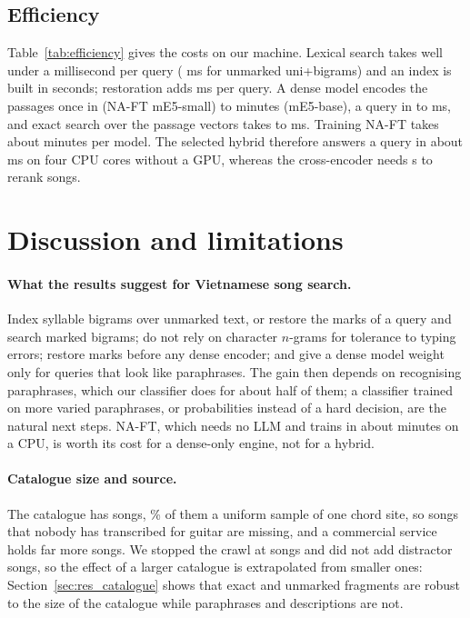 \documentclass[11pt]{article}
\begin{document}
\subsection{Efficiency}\label{sec:res_efficiency}

Table~\ref{tab:efficiency} gives the costs on our machine. Lexical search takes well under a millisecond per
query (\EffLexMsNodiac{} ms for unmarked uni+bigrams) and an index is built in seconds; restoration adds
\RestoreMsAll{} ms per query. A dense model encodes the \NPassages{} passages once in \EffEncodeMinNaftesmalls{}
(NA-FT mE5-small) to \EffEncodeMinEbase{} minutes (mE5-base), a query in \EffQueryMsNaftesmalls{} to
\EffQueryMsEbase{} ms, and exact search over the passage vectors takes \EffSearchMsNaftesmalls{} to
\EffSearchMsEbase{} ms. Training NA-FT takes about \NaftTrainMinutes{} minutes per model. The selected hybrid
therefore answers a query in about \EffHybridMs{} ms on four CPU cores without a GPU, whereas the cross-encoder
needs \RerankSecPerQuery{} s to rerank \RerankDepth{} songs.

\section{Discussion and limitations}\label{sec:limitations}

\paragraph{What the results suggest for Vietnamese song search.} Index syllable bigrams over unmarked text,
or restore the marks of a query and search marked bigrams; do not rely on character $n$-grams for tolerance
to typing errors; restore marks before any dense encoder; and give a dense model weight only for queries that
look like paraphrases. The gain then depends on recognising paraphrases, which our classifier does for about
half of them; a classifier trained on more varied paraphrases, or probabilities instead of a hard decision,
are the natural next steps. NA-FT, which needs no LLM and trains in about \NaftTrainMinutes{} minutes on a CPU, is worth its cost for a
dense-only engine, not for a hybrid.

\paragraph{Catalogue size and source.} The catalogue has \NSongs{} songs, \UniformShare\% of them a uniform sample
of one chord site, so songs that nobody has transcribed for guitar are missing, and a commercial service holds
far more songs. We stopped the crawl at \CrawlSongs{} songs and did not add distractor songs, so the effect of
a larger catalogue is extrapolated from smaller ones: Section~\ref{sec:res_catalogue} shows that exact and
unmarked fragments are robust to the size of the catalogue while paraphrases and descriptions are not.
\end{document}
